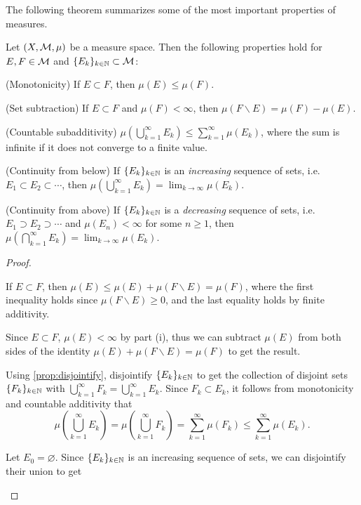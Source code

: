 \documentclass[main.tex]{subfiles}
\begin{document}
The following theorem summarizes some of the most important properties of measures.
\begin{theorem}\label{th:measureprop}
Let $(X, {\mathcal M}, \mu)$ be a measure space. Then the following properties hold for $E, F \in {\mathcal M}$ and $\{ E_k\}_{k \in {\mathbb N}} \subset {\mathcal M}$:
\begin{romannum}
\item (Monotonicity) If $E \subset F$, then $\mu(E) \leq \mu(F)$.
\item (Set subtraction) If $E \subset F$ and $\mu(F) < \infty$, then $\mu(F\backslash E) = \mu(F) - \mu(E)$.
\item (Countable subadditivity) $\mu\left( \bigcup_{k=1}^\infty E_k\right) \leq \sum_{k=1}^\infty \mu(E_k)$, where the sum is infinite if it does not converge to a finite value.
\item (Continuity from below) If $\{ E_k\}_{k \in {\mathbb N}}$ is an \emph{increasing} sequence of sets, i.e. $E_1 \subset E_2 \subset \cdots$, then $\mu\left( \bigcup_{k=1}^\infty E_k\right) = \lim_{k\rightarrow \infty}\mu(E_k)$.
\item (Continuity from above) If $\{ E_k\}_{k \in {\mathbb N}}$ is a \emph{decreasing} sequence of sets, i.e. $E_1 \supset E_2 \supset \cdots$ and $\mu(E_n) < \infty$ for some $n \geq 1$, then $\mu\left( \bigcap_{k=1}^\infty E_k\right) = \lim_{k\rightarrow \infty}\mu(E_k)$.
\end{romannum}
\begin{proof}
\begin{romannum}
\item If $E \subset F$, then $\mu(E) \leq \mu(E) + \mu(F\backslash E) = \mu(F)$, where the first inequality holds since $\mu(F\backslash E) \geq 0$, and the last equality holds by finite additivity.
\item Since $E \subset F$, $\mu(E) < \infty$ by part (i), thus we can subtract $\mu(E)$ from both sides of the identity $\mu(E) + \mu(F\backslash E) = \mu(F)$ to get the result.
\item Using \cref{prop:disjointify}, disjointify $\{ E_k\}_{k \in {\mathbb N}}$ to get the collection of disjoint sets $\{ F_k\}_{k \in {\mathbb N}}$ with $\bigcup_{k=1}^\infty F_k = \bigcup_{k=1}^\infty E_k$. Since $F_k \subset E_k$, it follows from monotonicity and countable additivity that
\[
\mu\left( \bigcup_{k=1}^\infty E_k\right) = \mu\left( \bigcup_{k=1}^\infty F_k\right) 
= \sum_{k=1}^\infty \mu(F_k) \leq \sum_{k=1}^\infty \mu(E_k).
\]
\item Let $E_0 = \varnothing$. Since $\{ E_k\}_{k \in {\mathbb N}}$ is an increasing sequence of sets, we can disjointify their union to get 

\end{romannum}
\end{proof}
\end{theorem}
\end{document}
